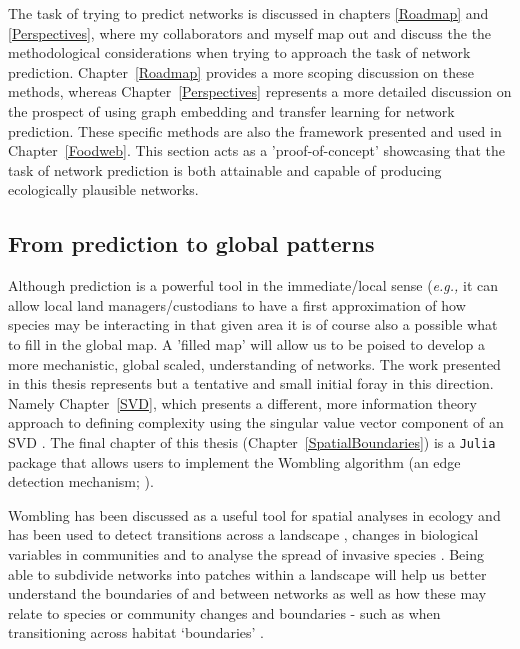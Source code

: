 The task of trying to predict networks is discussed in chapters \ref{Roadmap}
and \ref{Perspectives}, where my collaborators and myself map out and
discuss the the methodological considerations when trying to approach the task
of network prediction. Chapter~\ref{Roadmap} provides a more scoping discussion
on these methods, whereas Chapter~\ref{Perspectives} represents a more detailed
discussion on the prospect of using graph embedding and transfer learning
for network prediction. These specific methods are also the framework presented
and used in Chapter~\ref{Foodweb}. This section acts as a 'proof-of-concept'
showcasing that the task of network prediction is both attainable and
capable of producing ecologically plausible networks.

\subsection{From prediction to global patterns}

Although prediction is a powerful tool in the immediate/local sense 
(\emph{e.g.,} it can allow local land managers/custodians to have a 
first approximation
of how species may be interacting in that given area it is of course
also a possible what to fill in the global map. A 'filled map' will
allow us to be poised to develop a more mechanistic, global scaled,
understanding of networks. The work presented in this thesis represents
but a tentative and small initial foray in this direction. Namely
Chapter~\ref{SVD}, which presents a different, more information theory 
approach to defining complexity using the singular value vector component
of an SVD \cite{Shannon1948MatThe}. The final chapter of this thesis
(Chapter~\ref{SpatialBoundaries}) is a \texttt{Julia} package that
allows users to implement the Wombling algorithm (an edge
detection mechanism; \cite{Womble1951DifSys}).

Wombling has been discussed as a useful tool for spatial analyses in
ecology \cite{Fortin2005SpaAna} and has been used to detect transitions
across a landscape \cite{Philibert2008SpaStr}, changes in biological
variables in communities \cite{Barbujani1989DetReg} and to analyse the
spread of invasive species \cite{Fitzpatrick2010EcoBou}. Being able to
subdivide networks into patches within a landscape will help us better
understand the boundaries of and between networks as well as how these
may relate to species or community changes and boundaries - such as when
transitioning across habitat `boundaries' \cite{Hackett2019ResOur}.


